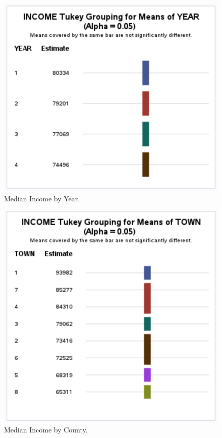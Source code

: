 \documentclass[12pt]{article}
\begin{document}
\begin{figure}[tbp]
  \centering
  \includegraphics[width=\textwidth]{Income by year.pdf}
  \caption{Median Income by Year.}\label{fig:cars}
\end{figure}

\begin{figure}[tbp]
    \centering
    \includegraphics[width=\textwidth]{Income by town.pdf}
    \caption{Median Income by County.}\label{fig:cars}
  \end{figure}
\end{document}

